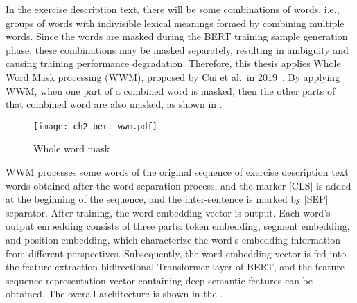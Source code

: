 

In the exercise description text, there will be some combinations of words, i.e., groups of words with indivisible lexical meanings formed by combining multiple words. Since the words are masked during the BERT training sample generation phase, these combinations may be masked separately, resulting in ambiguity and causing training performance degradation. Therefore, this thesis applies Whole Word Mask processing (WWM), proposed by Cui et al.\ in 2019~\cite{cui2019pre}. By applying WWM, when one part of a combined word is masked, then the other parts of that combined word are also masked, as shown in \figname{\ref{fig:ch2-bert-wwm}}.

\begin{figure}[htbp!]
    \centering
    \texttt{[image: ch2-bert-wwm.pdf]}
    \caption{Whole word mask}\label{fig:ch2-bert-wwm}
\end{figure}


WWM processes some words of the original sequence of exercise description text words obtained after the word separation process, and the marker [CLS] is added at the beginning of the sequence, and the inter-sentence is marked by [SEP] separator. After training, the word embedding vector is output. Each word's output embedding consists of three parts: token embedding, segment embedding, and position embedding, which characterize the word's embedding information from different perspectives. Subsequently, the word embedding vector is fed into the feature extraction bidirectional Transformer layer of BERT, and the feature sequence representation vector containing deep semantic features can be obtained. The overall architecture is shown in the \figname{\ref{fig:ch2-bert-model}}.

